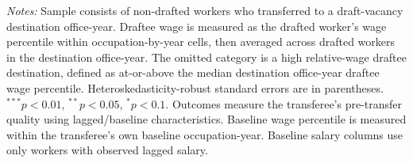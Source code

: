 \begin{table}[htbp]
\centering
\caption{Replacement Quality by Relative Draftee Wage}
\label{tab:replacement-quality-relative-draftee-wage}
\scriptsize
\begin{threeparttable}
%
\begin{tablenotes}[flushleft]\footnotesize
\item \textit{Notes:} Sample consists of non-drafted workers who transferred to a draft-vacancy destination office-year. Draftee wage is measured as the drafted worker's wage percentile within occupation-by-year cells, then averaged across drafted workers in the destination office-year. The omitted category is a high relative-wage draftee destination, defined as at-or-above the median destination office-year draftee wage percentile. Heteroskedasticity-robust standard errors are in parentheses. $^{***}p<0.01$, $^{**}p<0.05$, $^{*}p<0.1$. Outcomes measure the transferee's pre-transfer quality using lagged/baseline characteristics. Baseline wage percentile is measured within the transferee's own baseline occupation-year. Baseline salary columns use only workers with observed lagged salary.
\end{tablenotes}\end{threeparttable}\end{table}

